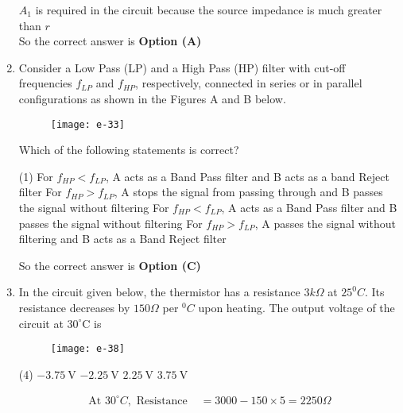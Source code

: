 \begin{enumerate}
\begin{tasks}
	\end{tasks}
\begin{answer}$\left. \right. $\\
	$A_{1}$ is required in the circuit because the source impedance is much greater than $r$\\
	So the correct answer is \textbf{Option (A)}
\end{answer}
	\item Consider a Low Pass (LP) and a High Pass (HP) filter with cut-off frequencies $f_{L P}$ and $f_{H P}$, respectively, connected in series or in parallel configurations as shown in the Figures A and B below.\\
	\begin{figure}[H]
		\centering
		\texttt{[image: e-33]}
	\end{figure}
	Which of the following statements is correct?
	{	}
	\begin{tasks}(1)
		\task[\textbf{A.}] For $f_{H P}<f_{L P}$, A acts as a Band Pass filter and B acts as a band Reject filter
		\task[\textbf{B.}] For $f_{H P}>f_{L P}$, A stops the signal from passing through and B passes the signal without filtering
		\task[\textbf{C.}] For $f_{H P}<f_{L P}$, A acts as a Band Pass filter and B passes the signal without filtering
		\task[\textbf{D.}] For $f_{H P}>f_{L P}$, A passes the signal without filtering and B acts as a Band Reject filter
	\end{tasks}
\begin{answer}
	So the correct answer is \textbf{Option (C)}
\end{answer}
	\item In the circuit given below, the thermistor has a resistance $3 k \Omega$ at $25^{0} C$. Its resistance decreases by $150 \Omega$ per ${ }^{0} C$ upon heating. The output voltage of the circuit at $30^{\circ} \mathrm{C}$ is
	{	}
	\begin{figure}[H]
		\centering
		\texttt{[image: e-38]}
	\end{figure}
	\begin{tasks}(4)
		\task[\textbf{A.}] $-3.75 \mathrm{~V}$
		\task[\textbf{B.}] $-2.25 \mathrm{~V}$
		\task[\textbf{C.}] $2.25 \mathrm{~V}$
		\task[\textbf{D.}] $3.75 \mathrm{~V}$
	\end{tasks}
\begin{answer}
	\begin{align*}
	\text{At }30^{\circ} C,\text{ Resistance }&=3000-150 \times 5=2250 \Omega\\

\end{align*}
\end{answer}
\end{enumerate}
